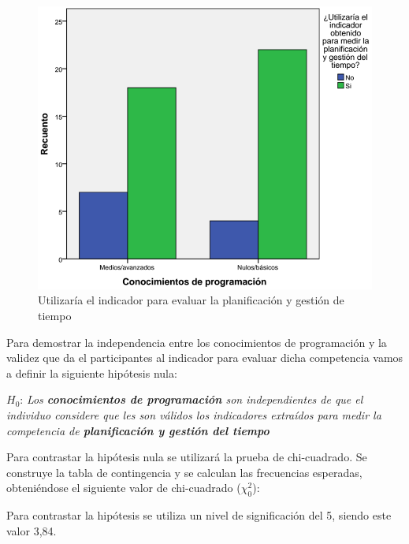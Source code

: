 \begin{figure}
  \begin{center}
    \includegraphics[scale=0.3]{barras_programacion_planificacion.png}
  \end{center}
  \caption{Utilizaría el indicador para evaluar la planificación y gestión de tiempo}
  \label{fig:app:barras:programacion:planificacion}
\end{figure}

Para demostrar la independencia entre los conocimientos de programación y la validez que da el participantes al indicador para evaluar dicha competencia vamos a definir la siguiente hipótesis nula:

\begin{mdframed}[style=hipotesis0]
$H_0$: \emph{Los \textbf{conocimientos de programación} son independientes de que el individuo considere que les son válidos los indicadores extraídos para medir la competencia de \textbf{planificación y gestión del tiempo}}
\end{mdframed}

Para contrastar la hipótesis nula se utilizará la prueba de chi-cuadrado. Se construye la tabla de contingencia y se calculan las frecuencias esperadas, obteniéndose el siguiente valor de chi-cuadrado ($\chi^2_0$): 

\begin{center}
\end{center}

Para contrastar la hipótesis se utiliza un nivel de significación del 5\percentage, siendo este valor 3,84. 

